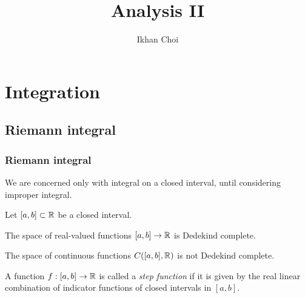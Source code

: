 \documentclass{../../large}
\begin{document}
\title{Analysis II}
\author{Ikhan Choi}
\maketitle




\tableofcontents




\part{Integration}
\chapter{Riemann integral}


\section{Riemann integral}
We are concerned only with integral on a closed interval, until considering improper integral.



\begin{prb}
Let $[a,b]\subset\mathbb{R}$ be a closed interval.
\begin{parts}
\item The space of real-valued functions $[a,b]\to\mathbb{R}$ is Dedekind complete.
\item The space of continuous functions $C([a,b],\mathbb{R})$ is not Dedekind complete.
\end{parts}
\end{prb}


\begin{prb}
A function $f:[a,b]\to\mathbb{R}$ is called a \emph{step function} if it is given by the real linear combination of indicator functions of closed intervals in $[a,b]$.
\end{prb}
\end{document}
